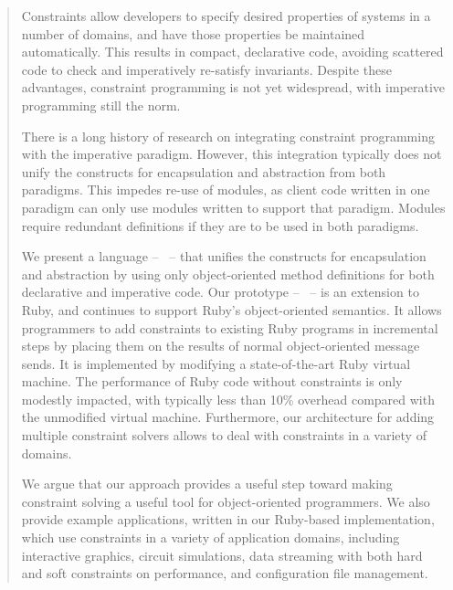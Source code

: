 \begin{abstract}
  Constraints allow developers to specify desired properties of
  systems in a number of domains, and have those properties be
  maintained automatically.  This results in compact, declarative
  code, avoiding scattered code to check and imperatively re-satisfy
  invariants.  Despite these advantages, constraint programming is not
  yet widespread, with imperative programming still the norm.

  There is a long history of research on integrating
  constraint programming with the imperative
  paradigm. However, this integration typically does not unify the
  constructs for encapsulation and abstraction from both
  paradigms. This impedes re-use of modules, as client code written in
  one paradigm can only use modules written to support that
  paradigm. Modules require redundant definitions if they are to be
  used in both paradigms.

  We present a language -- \langname~-- that unifies the constructs
  for encapsulation and abstraction
  by using only object-oriented method definitions
  for both declarative and imperative code. Our prototype --
  \toolname~-- is an extension to Ruby, and continues to support
  Ruby's object-oriented semantics.  It allows
  programmers to add constraints to existing Ruby programs in
  incremental steps by placing them on the results of normal
  object-oriented message sends.  It is implemented by modifying
  a state-of-the-art Ruby virtual machine.  The performance of 
  Ruby code without constraints is only modestly impacted,
  with typically less than 10\% overhead compared with the unmodified
  virtual machine. Furthermore, our architecture for adding multiple
  constraint solvers allows \langname to deal with constraints in a
  variety of domains.

  We argue that our approach provides a useful step toward making
  constraint solving a useful tool for object-oriented programmers.
  We also provide example applications, written in our Ruby-based
  implementation, which use constraints in a variety of application
  domains, including interactive graphics, circuit simulations, data
  streaming with both hard and soft constraints on performance, and
  configuration file management.



\end{abstract}
